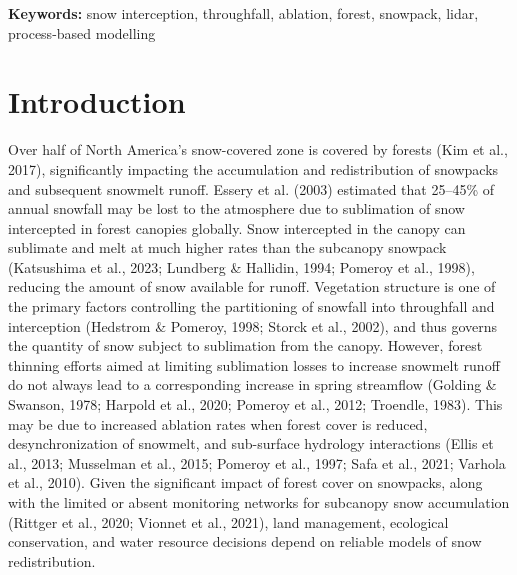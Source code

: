 \documentclass[
  letterpaper,
  DIV=11,
  numbers=noendperiod]{scrartcl}
\begin{document}
\textbf{Keywords:} snow interception, throughfall, ablation, forest,
snowpack, lidar, process-based modelling

\section{Introduction}\label{introduction}

Over half of North America's snow-covered zone is covered by forests
(Kim et al., 2017), significantly impacting the accumulation and
redistribution of snowpacks and subsequent snowmelt runoff. Essery et
al. (2003) estimated that 25--45\% of annual snowfall may be lost to the
atmosphere due to sublimation of snow intercepted in forest canopies
globally. Snow intercepted in the canopy can sublimate and melt at much
higher rates than the subcanopy snowpack (Katsushima et al., 2023;
Lundberg \& Hallidin, 1994; Pomeroy et al., 1998), reducing the amount
of snow available for runoff. Vegetation structure is one of the primary
factors controlling the partitioning of snowfall into throughfall and
interception (Hedstrom \& Pomeroy, 1998; Storck et al., 2002), and thus
governs the quantity of snow subject to sublimation from the canopy.
However, forest thinning efforts aimed at limiting sublimation losses to
increase snowmelt runoff do not always lead to a corresponding increase
in spring streamflow (Golding \& Swanson, 1978; Harpold et al., 2020;
Pomeroy et al., 2012; Troendle, 1983). This may be due to increased
ablation rates when forest cover is reduced, desynchronization of
snowmelt, and sub-surface hydrology interactions (Ellis et al., 2013;
Musselman et al., 2015; Pomeroy et al., 1997; Safa et al., 2021; Varhola
et al., 2010). Given the significant impact of forest cover on
snowpacks, along with the limited or absent monitoring networks for
subcanopy snow accumulation (Rittger et al., 2020; Vionnet et al.,
2021), land management, ecological conservation, and water resource
decisions depend on reliable models of snow redistribution.
\end{document}

